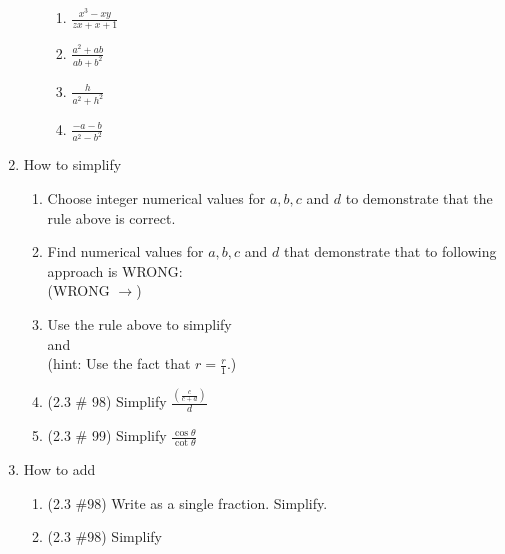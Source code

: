 \documentclass[11pt,fleqn]{article}
\begin{document}
\begin{enumerate}
\begin{enumerate}
\begin{enumerate}
		\item $\frac{x^3-xy}{zx+x+1}$\\
		\vfill
		
		\item $\frac{a^2+ab}{ab+b^2}$\\
		\vfill
		
		\item $\frac{h}{a^2+h^2}$\\
		\vfill
		
		\item $\frac{-a-b}{a^2-b^2}$\\
		\vfill
		
		\end{enumerate}
		\vfill
	\end{enumerate}

\item How to simplify 
	\begin{enumerate}
	\item Choose integer numerical values for $a, b, c$ and $d$ to demonstrate that the rule above is correct.
	\vfill
	\item Find numerical values for $a, b, c$ and $d$ that demonstrate that to following approach is WRONG:\\
	(WRONG $\longrightarrow$) 
	\vfill
	\newpage
	\item Use the rule above to simplify\\
	 \hspace{2in} and \hspace{1in}\\
	
	(hint: Use the fact that $r=\frac{r}{1}.$)
	
	\item (2.3 \# 98) Simplify $\frac{\left(\frac{c}{c+d}\right)}{d}$
	\vfill
	\item (2.3 \# 99) Simplify $\frac{\cos \theta}{\cot \theta}$
	\vfill	
	\end{enumerate}
	
\item How to add 
	\begin{enumerate}
	\item (2.3 \#98) Write as a single fraction. Simplify. \\
	
	\vfill
	\item (2.3 \#98) Simplify 
	\vfill
	\end{enumerate}
\end{enumerate}
\end{document}
